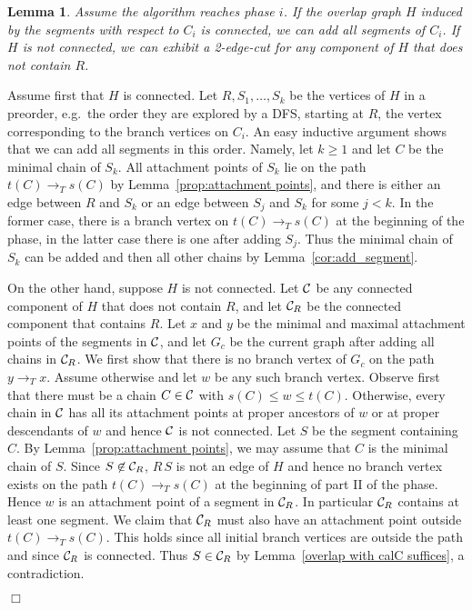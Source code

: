 \documentclass[paper=a4]{scrartcl}
\newtheorem{lemma}{Lemma}
\newcommand{\mqed}{\hfill$\Box$}
\newlength{\proofpostskipamount}\newlength{\proofpreskipamount}
\newenvironment{proof}{\par\vspace{\proofpreskipamount}\noindent{\textbf{Proof:}}\hspace{0.5em}}{\nopagebreak \strut\nopagebreak \hspace{\fill}\mqed\par\vspace{\proofpostskipamount}\noindent}
\newcommand{\edge}[2]{\ensuremath{#1\,#2}}
\begin{document}
\begin{lemma}\label{lem:add_hard_segments}
  Assume the algorithm reaches phase $i$. If the overlap graph $H$ induced by the segments with respect to  $C_i$ is connected, we can add all segments of $C_i$. If $H$ is not connected, we can exhibit a 2-edge-cut for any component of $H$ that does not contain $R$.
\end{lemma}
\begin{proof} Assume first that $H$ is connected. Let $R,S_1,\ldots,S_k$ be the vertices of $H$ in a preorder, e.g.\ the order they are explored by a DFS, starting at $R$, the vertex corresponding to the branch vertices on $C_i$. An easy inductive argument shows that we can add all segments in this order. Namely, let $k \ge 1$ and let $C$ be the minimal chain of $S_k$. All attachment points of $S_k$ lie on the path $t(C) \rightarrow_T s(C)$ by Lemma~\ref{prop:attachment points}, and there is either an edge between $R$ and $S_k$ or an edge between $S_j$ and $S_k$ for some $j <k$.  In the former case, there is a branch vertex on $t(C) \rightarrow_T s(C)$ at the beginning of the phase, in the latter case there is one after adding $S_j$. Thus the minimal chain of $S_k$ can be added and then all other chains by Lemma~\ref{cor:add_segment}.

On the other hand, suppose $H$ is not connected. Let ${\mathcal{C}}$ be any connected component of $H$ that does not contain $R$, and let ${\mathcal{C}}_R$ be the connected component that contains $R$. Let $x$ and $y$ be the minimal and maximal attachment points of the segments in ${\mathcal{C}}$, and let $G_c$ be the current graph after adding all chains in ${\mathcal{C}}_R$. We first show that there is no branch vertex of $G_c$ on the path $y \rightarrow_T x$. Assume otherwise and let $w$ be any such branch vertex. Observe first that there must be a chain $C \in {\mathcal{C}}$ with $s(C) \le w \le t(C)$. Otherwise, every chain in ${\mathcal{C}}$ has all its attachment points at proper ancestors of $w$ or at proper descendants of $w$ and hence ${\mathcal{C}}$ is not connected. Let $S$ be the segment containing $C$. By Lemma~\ref{prop:attachment points}, we may assume that $C$ is the minimal chain of $S$. Since $S \not\in {\mathcal{C}}_R$, $\edge{R}{S}$ is not an edge of $H$ and hence no branch vertex exists on the path $t(C)  \rightarrow_T s(C)$ at the beginning of part II of the phase. Hence $w$ is an attachment point of a segment in ${\mathcal{C}}_R$. In particular ${\mathcal{C}}_R$ contains at least one segment. We claim that ${\mathcal{C}}_R$ must also have an attachment point outside $t(C)  \rightarrow_T s(C)$. This holds since all initial branch vertices are outside the path and since ${\mathcal{C}}_R$ is connected. Thus $S \in {\mathcal{C}}_R$ by Lemma~\ref{overlap with calC suffices},  a contradiction.


\end{proof}
\end{document}
